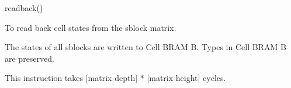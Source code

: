 

\format

readback()

\purpose

To read back cell states from the sblock matrix.

\description

The states of all sblocks are written to Cell BRAM B.
Types in Cell BRAM B are preserved.

\notes

This instruction takes [matrix depth] * [matrix height] cycles.
